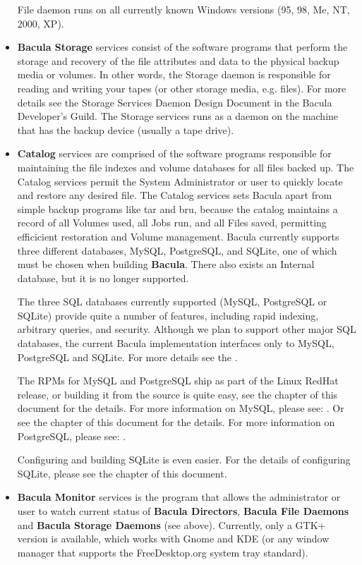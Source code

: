 \begin{itemize}
File daemon runs on  all currently known Windows versions (95, 98, Me, NT,
2000, XP). 
\item 
   \label{SDDef}
   {\bf Bacula Storage} services consist of the software programs that  perform
the storage and recovery of the file attributes and data to  the physical
backup media or volumes. In other words, the Storage daemon  is responsible
for reading and writing your tapes (or other  storage media, e.g. files). For
more details see the  Storage Services Daemon Design Document in the Bacula
Developer's Guild.  The Storage services runs as a daemon on the machine that
has the  backup device (usually a tape drive). 
\item 
   \label{DBDefinition}
   {\bf Catalog} services are comprised of the software programs  responsible for
maintaining the file indexes and volume databases for  all files backed up.
The Catalog services permit the System  Administrator or user to quickly
locate and restore any desired  file. The Catalog services sets Bacula apart
from simple backup  programs like tar and bru, because the catalog maintains a
record  of all Volumes used, all Jobs run, and all Files saved, permitting 
efficicient restoration and Volume management.  Bacula currently supports
three different databases, MySQL,  PostgreSQL, and SQLite, one of which must
be chosen when building  {\bf Bacula}. There also exists an Internal database,
but it is no  longer supported.  

The three SQL databases currently supported (MySQL, PostgreSQL or SQLite) 
provide quite a number of features,  including rapid indexing, arbitrary
queries, and security. Although  we plan to support other major SQL databases,
the current  Bacula implementation interfaces only to MySQL, PostgreSQL and
SQLite.  For more details see the 
.  

The RPMs for MySQL and PostgreSQL ship as part of the Linux RedHat release, 
or building it from the source is quite easy, see the  
 chapter  of
this document for the details. For more information on MySQL,  please see: 
.  Or see the 
chapter of this document for the details. For more  information on PostgreSQL,
please see: 
.  

Configuring and building SQLite is even easier. For the details  of
configuring SQLite, please see the 
 chapter
of this document. 
\item 
   \label{MonDef}
   {\bf Bacula Monitor} services is the program that allows the  administrator or
user to watch current status of {\bf Bacula Directors},  {\bf Bacula File
Daemons} and {\bf Bacula Storage Daemons}  (see above). Currently, only a GTK+
version is available, which  works with Gnome and KDE (or any window manager
that supports the  FreeDesktop.org system tray standard). 
\end{itemize}

